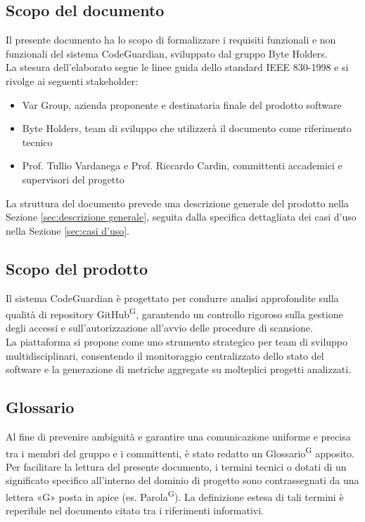 \documentclass[a4paper, 11pt]{article}
\begin{document}
\subsection{Scopo del documento}
Il presente documento ha lo scopo di formalizzare i requisiti funzionali e non funzionali del sistema CodeGuardian, sviluppato dal gruppo Byte Holders. \\
La stesura dell'elaborato segue le linee guida dello standard IEEE 830-1998 e si rivolge ai seguenti stakeholder:
\begin{itemize}
	\item Var Group, azienda proponente e destinataria finale del prodotto software
	\item Byte Holders, team di sviluppo che utilizzerà il documento come riferimento tecnico
	\item Prof. Tullio Vardanega e Prof. Riccardo Cardin, committenti accademici e supervisori del progetto
\end{itemize}
La struttura del documento prevede una descrizione generale del prodotto nella Sezione \ref{sec:descrizione generale}, seguita dalla specifica dettagliata dei casi d'uso nella Sezione \ref{sec:casi d'uso}.

\subsection{Scopo del prodotto}
Il sistema CodeGuardian è progettato per condurre analisi approfondite sulla qualità di repository GitHub\textsuperscript{G}, garantendo un controllo rigoroso sulla gestione degli accessi e sull'autorizzazione all'avvio delle procedure di scansione.
\\
La piattaforma si propone come uno strumento strategico per team di sviluppo multidisciplinari, consentendo il monitoraggio centralizzato dello stato del software e la generazione di metriche aggregate su molteplici progetti analizzati.

\subsection{Glossario}
Al fine di prevenire ambiguità e garantire una comunicazione uniforme e precisa tra i membri del gruppo e i committenti, è stato redatto un Glossario\textsuperscript{G} apposito.
Per facilitare la lettura del presente documento, i termini tecnici o dotati di un significato specifico all'interno del dominio di progetto sono contrassegnati da una lettera «G» posta in apice (es. Parola\textsuperscript{G}).
La definizione estesa di tali termini è reperibile nel documento citato tra i riferimenti informativi.
\end{document}
